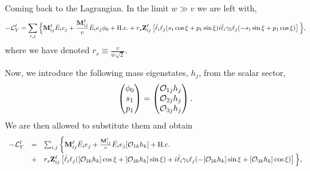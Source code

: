 \documentclass[aps,prd,groupaddress,floatfix,tighten,nofootinbib,showpacs,
amsfonts,superscriptaddress]{revtex4}
\def\be{\begin{equation}}
\def\ee{\end{equation}}
\begin{document}
Coming back to the Lagrangian. In the limit $w \gg v$ we are left with,
%
\be
-{\cal L}_Y^\ell = \sum_{i,j} \Big \lbrace {\bf M}^\ell_{ij} 
\bar{E}_{i} e_j  +  \frac{{\bf M}^\ell_{ij}}{v} \bar{E}_{i} e_j \phi_0 +  {\textrm{H.c.}}
+ r_s {\bf Z}_{ij}^\ell \left[  \bar{\ell}_{i} \ell_j  (s_1 \cos \xi + p_1 \sin \xi ) i \bar{\ell}_{i} \gamma_5 \ell_j  (- s_1 \sin \xi + p_1 \cos \xi ) \right] 
\Big  \rbrace,
\ee	
%
where we have denoted $r_s \equiv \frac{v}{w\sqrt{2}}$.
	
Now, we introduce the following mass eigenstates, $h_j$, from the scalar sector,
%
\be
\begin{pmatrix}
			\phi_0  \\
			s_1 \\
			p_1 
		\end{pmatrix}
		= \begin{pmatrix}
			{\cal O}_{1j} h_j \\
			{\cal O}_{2j} h_j \\
			{\cal O}_{3j} h_j
\end{pmatrix}.
\ee
%
We are then allowed to substitute them and obtain
%
\be
\begin{array} {rcl}
-{\cal L}_Y^\ell &=& \sum_{i,j} \left \lbrace {\bf M}^\ell_{ij} 
\bar{E}_{i} e_j  +  \frac{{\bf M}^\ell_{ij}}{v} \bar{E}_{i} e_j [{\cal O}_{1k} h_k]  +  {\textrm{H.c.}}
 \right. \\
&+& r_s {\bf Z}_{ij}^\ell \left[  \bar{\ell}_{i} \ell_j  ([{\cal O}_{2k} h_k]  \cos \xi + [{\cal O}_{3k} h_k]  \sin \xi )
+  i \bar{\ell}_{i} \gamma_5 \ell_j  (- [{\cal O}_{2k} h_k]  \sin \xi + [{\cal O}_{3k} h_k]  \cos \xi ) \right] 
		 \Big \rbrace, 
\end{array}
\ee	
%
\end{document}
